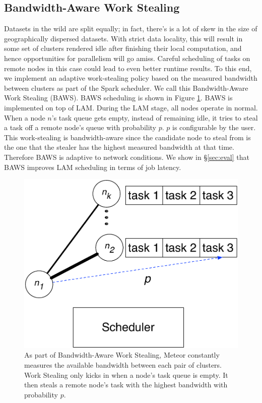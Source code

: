 \subsection{Bandwidth-Aware Work Stealing}

Datasets in the wild are split equally; in fact, there's is a lot of skew in the size of geographically dispersed datasets.  With strict data locality, this will result in some set of clusters rendered idle after finishing their local computation, and hence opportunities for parallelism will go amiss.  Careful scheduling of tasks on remote nodes in this case could lead to even better runtime results. To this end, we implement an adaptive work-stealing policy based on the measured bandwidth between clusters as part of the Spark scheduler. We call this Bandwidth-Aware Work Stealing (BAWS). BAWS scheduling is shown in Figure \ref{fig:baws}. BAWS is implemented on top of LAM. During the LAM stage, all nodes operate in normal. When a node $n$'s task queue gets empty,
instead of remaining idle, it tries to steal a task off a remote node's queue with probability $p$. $p$ is configurable by the user. This work-stealing is bandwidth-aware since the candidate node to steal from is the one that the stealer has the highest measured bandwidth at that time. Therefore BAWS is adaptive to network conditions. 
We show in \S \ref{sec:eval}  that BAWS improves LAM scheduling in terms of job latency.

\begin{figure}[!ht]
\centering\includegraphics[width=0.5\columnwidth]{figs/BOSS.pdf}
\vspace{-1.2em}
\caption{As part of Bandwidth-Aware Work Stealing, Meteor constantly measures the available bandwidth between each pair of clusters. Work Stealing only kicks in when a node's task queue is empty. It then steals a remote node's task with the highest bandwidth with probability $p$. }
\label{fig:baws}
\vspace{.7em}
\end{figure}

